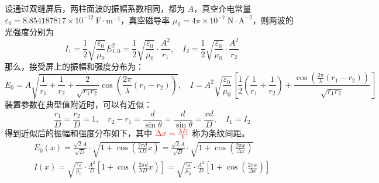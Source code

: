 \documentclass[UTF8]{report}
\theoremstyle{MyLineTheoremStyle} %
\theoremstyle{MyBlockTheoremStyle} %
\theoremstyle{MySubsubsectionStyle} %
\begin{document}
设通过双缝屏后，两柱面波的振幅系数相同，都为 $A$，真空介电常量 $\varepsilon_0 = 8.854187817 \times 10^{-12}\ \mathrm{F\cdot m^{-1}}$，真空磁导率 $\mu_0 = 4\pi \times 10^{-7}\ \mathrm{N\cdot A^{-2}}$，则两波的光强度分别为
\begin{equation}
    I_1 = \frac{1}{2}\sqrt{\frac{\varepsilon_0}{\mu_0}}E_{1,0}^2 = \frac{1}{2}\sqrt{\frac{\varepsilon_0}{\mu_0}} \cdot \frac{A^2}{r_1},\quad
    I_2 = \frac{1}{2}\sqrt{\frac{\varepsilon_0}{\mu_0}} \cdot \frac{A^2}{r_2}
\end{equation}
那么，接受屏上的振幅和强度分布为：
\begin{equation}
    E_0 = A \sqrt{ \frac{1}{r_1} + \frac{1}{r_2} + \frac{2}{\sqrt{r_1r_2}} \cos \left( \frac{2 \pi}{\lambda}(r_1 - r_2) \right)  }  ,\quad 
    I = A^2\sqrt{\frac{\varepsilon_0}{\mu_0}}\left[ \frac{1}{2}\left( \frac{1}{r_1} + \frac{1}{r_2} \right) + \frac{\cos \left( \frac{2 \pi}{\lambda}(r_1 - r_2) \right)}{\sqrt{r_1r_2} } \right]
\end{equation}
装置参数在典型值附近时，可以有近似：
\begin{equation}\label{杨氏双缝干涉近似}
\frac{r_1}{D} = \frac{r_2}{D} = 1,\quad r_2 - r_1 = \frac{d}{\sin \theta} = \frac{d}{\sin \theta} = \frac{x d}{ D },\quad I_1 = I_2
\end{equation}
得到近似后的振幅和强度分布如下，其中 ${\color{red} \Delta x= \frac{\lambda D}{b}}$ 称为条纹间距。
\begin{gather}\label{杨氏双缝干涉近似结果}
    E_0(x) = \frac{\sqrt{2}A}{\sqrt{D}} \cdot \sqrt{1 + \cos \left( \frac{2 \pi d}{\lambda D}x \right)} = \frac{\sqrt{2}A}{\sqrt{D}} \cdot \sqrt{1 + \cos \left( \frac{2 \pi x}{\Delta x} \right)} \\ 
    I(x) = \sqrt{\frac{\varepsilon_0}{\mu_0}} \cdot \frac{A^2}{D} \left[ 1 + \cos \left( \frac{2 \pi  d}{\lambda D }x \right) \right] = \sqrt{\frac{\varepsilon_0}{\mu_0}} \cdot \frac{A^2}{D} \left[ 1 + \cos \left( \frac{2 \pi x}{\Delta x} \right) \right]
\end{gather}
\end{document}

